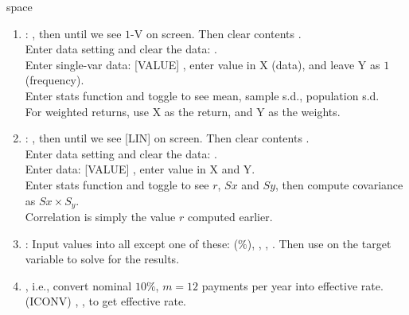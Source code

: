 \begin{method}{\color{white}space}
\begin{enumerate}[label=\roman*.]
\setlength{\itemsep}{0pt}
\item {}:  , then   until we see $1$-V on screen. Then clear contents . \\
Enter data setting and clear the data:    .\\
Enter single-var data: [VALUE]  \fbox{\strut \ $\downarrow$\ } \fbox{\strut \ $\downarrow$\ }, enter value in X (data), and leave Y as $1$ (frequency).\\
Enter stats function and toggle \fbox{\strut \ $\downarrow$\ } to see mean, sample s.d., population s.d.\\
For weighted returns, use X as the return, and Y as the weights.
\item {}:  , then   until we see [LIN] on screen. Then clear contents . \\
Enter data setting and clear the data:    .\\
Enter data: [VALUE]  \fbox{\strut \ $\downarrow$\ } \fbox{\strut \ $\downarrow$\ }, enter value in X and Y.\\
Enter stats function and toggle \fbox{\strut \ $\downarrow$\ } to see $r$, $Sx$ and $Sy$, then compute covariance as $Sx \times S_y$.\\
Correlation is simply the value $r$ computed earlier.
\item {}: Input values into all except one of these:   ($\%$), , , . Then use  on the target variable to solve for the results.
\item {}, i.e., convert nominal $10\%$, $m=12$ payments per year into effective rate.\\
  (ICONV) \fbox{\strut \ $\uparrow$\ } , \fbox{\strut $\downarrow$}  , \fbox{\strut $\downarrow$}  to get effective rate.

\end{enumerate}
\end{method}
